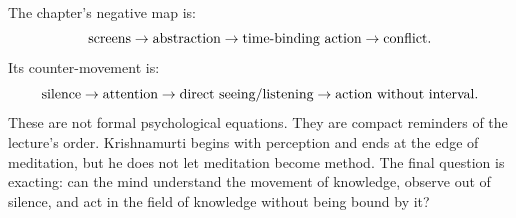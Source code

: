 The chapter's negative map is:
\begin{equation}
\hbox{screens}
\to
\hbox{abstraction}
\to
\hbox{time-binding action}
\to
\hbox{conflict}.
\end{equation}
Its counter-movement is:
\begin{equation}
\hbox{silence}
\to
\hbox{attention}
\to
\hbox{direct seeing/listening}
\to
\hbox{action without interval}.
\end{equation}
These are not formal psychological equations. They are compact reminders of the lecture's order. Krishnamurti begins with perception and ends at the edge of meditation, but he does not let meditation become method. The final question is exacting: can the mind understand the movement of knowledge, observe out of silence, and act in the field of knowledge without being bound by it?
